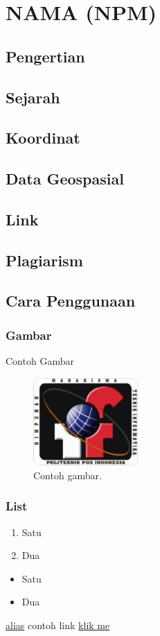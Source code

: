 \section{NAMA (NPM)}
\subsection{Pengertian}
\subsection{Sejarah}
\subsection{Koordinat}
\subsection{Data Geospasial}
\subsection{Link}
\subsection{Plagiarism}

\subsection{Cara Penggunaan}
\subsubsection{Gambar}

\hfill\break

Contoh Gambar
\begin{figure}[H]
	\includegraphics[width=4cm]{figures/himatif.png}
	\centering
	\caption{Contoh gambar.}
\end{figure}

\subsubsection{List}
\begin{enumerate}
	\item Satu
	\item Dua
\end{enumerate}

\begin{itemize}
	\item Satu
	\item Dua
\end{itemize}

\href{link kamu}{alias}
contoh link
\href{https://www.google.com/}{klik me}